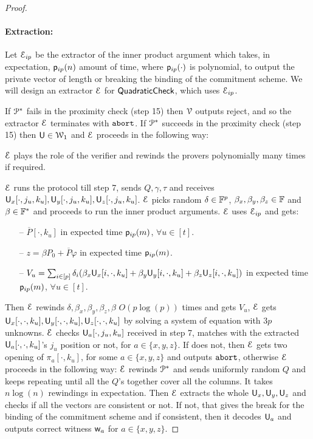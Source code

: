 \begin{proof}
	\paragraph*{Extraction:} Let $\mathcal{E}_{ip}$ be the extractor of the inner product argument which takes, in expectation, $\mathsf{p}_{ip}(n)$ amount of time, where $\mathsf{p}_{ip}(\cdot)$ is polynomial, to output the private vector of length or breaking the binding of the commitment scheme. We will design an extractor $\mathcal{E}$ for $\mathsf{QuadraticCheck}$, which uses $\mathcal{E}_{ip}$.
	
	\smallskip
	If $\mathcal{P}^\ast$ fails in the proximity check (step 15) then $\mathcal{V}$ outputs reject, and so the extractor $\mathcal{E}$ terminates with $\texttt{abort}$.
	If $\mathcal{P}^\ast$ succeeds in the proximity check (step 15) then $\mathsf{U}\in \mathcal{W}_1$ and $\mathcal{E}$ proceeds in the following way:
	
	\smallskip
	$\mathcal{E}$ plays the role of the verifier and rewinds the provers polynomially many times if required.
	
	
	\smallskip
	$\mathcal{E}$ runs the protocol till step 7, sends $Q,\gamma, \tau$ and receives $\mathsf{U}_x[\cdot, j_u,k_u], \mathsf{U}_y[\cdot, j_u,k_u], \mathsf{U}_z[\cdot,j_u,k_u]$.	
	$\mathcal{E}$ picks random $\delta\in \mathbb{F}^p$, $\beta_x,\beta_y,\beta_z\in\mathbb{F}$ and $\beta\in\mathbb{F}^\ast$ and proceeds to run the inner product arguments. $\mathcal{E}$ uses $\mathcal{E}_{ip}$ and gets:
	\begin{itemize}
		\item[--] $\overline{P}[\cdot,k_u]$ in expected time $\mathsf{p}_{ip}(m)$, $\forall u\in[t]$.
		\item[--] $z=\beta P_0 + \overline{P}\varphi$ in expected time $\mathsf{p}_{ip}(m)$.
		\item[--] $V_u = \sum_{i\in[p]} \delta_i(\beta_x\mathsf{U}_x[i,\cdot,k_u]+\beta_y\mathsf{U}_y[i,\cdot,k_u]+\beta_z\mathsf{U}_z[i,\cdot,k_u])$ in expected time $\mathsf{p}_{ip}(m)$, $\forall u\in[t]$.
	\end{itemize}
	Then $\mathcal{E}$ rewinds $\delta, \beta_x,\beta_y,\beta_z,\beta$ $O(p\log(p))$ times and gets $V_u$, $\mathcal{E}$ gets $\mathsf{U}_x[\cdot,\cdot,k_u], \mathsf{U}_y[\cdot,\cdot,k_u], \mathsf{U}_z[\cdot,\cdot,k_u]$ by solving a system of equation with $3p$ unknowns. $\mathcal{E}$ checks $\mathsf{U}_a[\cdot,j_u,k_u]$ received in step 7, matches with the extracted $\mathsf{U}_a[\cdot,\cdot,k_u]$'s $j_u$ position or not, for $a\in\{x,y,z\}$. If does not, then $\mathcal{E}$ gets two opening of $\pi_a[\cdot,k_u]$, for some $a\in\{x,y,z\}$ and outputs $\texttt{abort}$, otherwise $\mathcal{E}$ proceeds in the following way: $\mathcal{E}$ rewinds $\mathcal{P}^\ast$ and sends uniformly random $Q$ and keeps repeating until all the $Q$'s together cover all the columns. It takes $n\log(n)$ rewindings in expectation. Then $\mathcal{E}$ extracts the whole $\mathsf{U}_x,\mathsf{U}_y,\mathsf{U}_z$ and checks if all the vectors are consistent or not. If not, that gives the break for the binding of the commitment scheme and if consistent, then it decodes $\mathsf{U}_a$ and outputs correct witness $\mathsf{w}_a$ for $a\in\{x,y,z\}$. 
	\smallskip
	

\end{proof}
